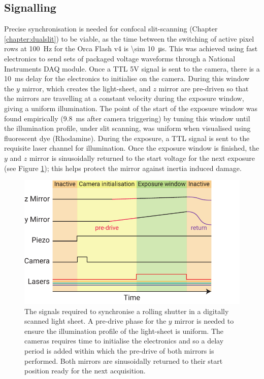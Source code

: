 \subsection{Signalling} %

Precise synchronisation is needed for confocal slit-scanning (Chapter \ref{chapter:dualslit}) to be viable, as the time between the switching of active pixel rows at \SI{100}{\hertz} for the Orca Flash v4 is \SI{\sim 10}{\micro\second}. %
This was achieved using fast electronics to send sets of packaged voltage waveforms through a National Instruments DAQ module.
Once a TTL 5V signal is sent to the camera, there is a \SI{10}{\milli\second} delay for the electronics to initialise on the camera.
During this window the $y$ mirror, which creates the light-sheet, and $z$ mirror are pre-driven so that the mirrors are travelling at a constant velocity during the exposure window, giving a uniform illumination.
The point of the start of the exposure window was found empirically (\SI{9.8}{\milli\second} after camera triggering) by tuning this window until the illumination profile, under slit scanning, was uniform when visualised using fluorescent dye (Rhodamine).
During the exposure, a TTL signal is sent to the requisite laser channel for illumination.
Once the exposure window is finished, the $y$ and $z$ mirror is sinusoidally returned to the start voltage for the next exposure (see Figure \ref{fig:slit_signals}); this helps protect the mirror against inertia induced damage.

\begin{figure}
  \centering
  \includegraphics{slit_signals}
  \caption{The signals required to synchronise a rolling shutter in a digitally scanned light sheet.
  A pre-drive phase for the $y$ mirror is needed to ensure the illumination profile of the light-sheet is uniform.
  The cameras requires time to initialise the electronics and so a delay period is added within which the pre-drive of both mirrors is performed.
  Both mirrors are sinusoidally returned to their start position ready for the next acquisition.
  }
  \label{fig:slit_signals}
\end{figure}

